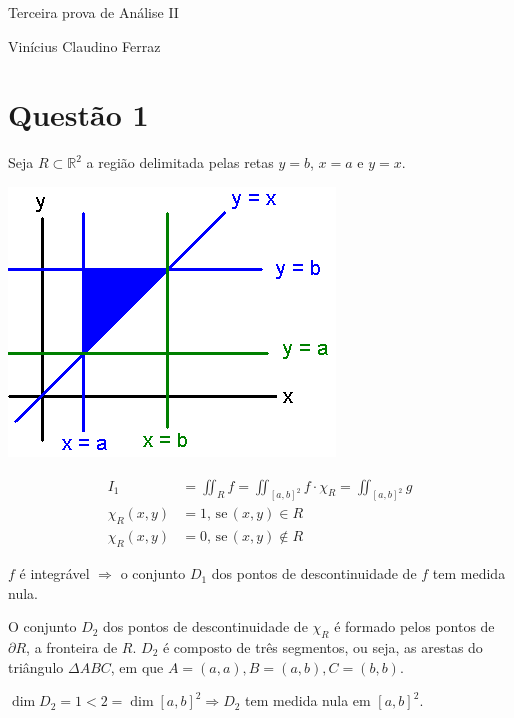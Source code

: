 \documentclass[12pt,a4paper]{article}
\date{}
\begin{document}
	\Large

	\begin{center}
		Terceira prova de An\'alise II

		Vin\'icius Claudino Ferraz
	\end{center}

	\normalsize

	\section{Quest\~ao 1}
		\begin{flushright}
		\end{flushright}

		Seja $R \subset \mathbb{R}^2$ a regi\~ao delimitada pelas retas $y = b$, $x = a$ e $y = x$.

		\begin{center}
		\includegraphics[scale=.5]{questao1}
		\end{center}

		\begin{align}
				I_1 &= \iint_R f = \iint_{[a, b]^2} f \cdot \chi_R = \iint_{[a, b]^2} g \\
				\chi_R(x, y) &= 1, \mathrm{\,se\,} (x, y) \in R \\
				\chi_R(x, y) &= 0, \mathrm{\,se\,} (x, y) \notin R
		\end{align}

		$f$ \'e integr\'avel $\Rightarrow$ o conjunto $D_1$ dos pontos de descontinuidade de $f$ tem medida nula.

		O conjunto $D_2$ dos pontos de descontinuidade de $\chi_R$ \'e formado pelos pontos de $\partial R$, a fronteira de $R$. $D_2$ \'e composto de tr\^es segmentos, ou seja, as arestas do tri\^angulo $\Delta ABC$, em que $A = (a, a), B = (a, b), C = (b, b)$.

		$\dim D_2 = 1 < 2 = \dim [a, b]^2 \Rightarrow D_2$ tem medida nula em $[a,b]^2$.
\end{document}
